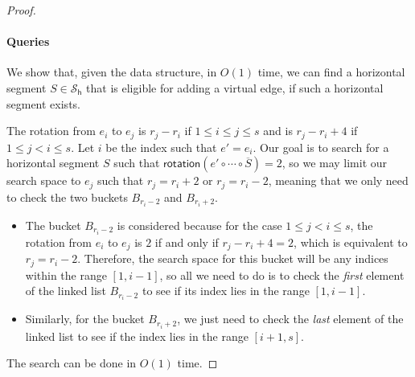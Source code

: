 \documentclass{article}\usepackage[a4paper,margin=20mm]{geometry}
\newcommand{\PH}{\mathcal{S}_\mathsf{h}}
\newcommand{\Nnorth}{\mathcal{N}_\mathsf{north}}
\newcommand{\rotation}{\mathsf{rotation}}
\begin{document}
\begin{proof}
\paragraph{Queries} We show that, given the data structure, in $O(1)$ time, we can find a horizontal segment $S \in \PH$ that is eligible for adding a virtual edge, if such a horizontal segment exists.

 The rotation  from $e_i$ to $e_j$ is $r_j - r_i$ if $1 \leq i \leq j \leq s$ and is $r_j - r_i +4$ if $1 \leq j < i \leq s$. Let $i$ be the index such that $e' = e_i$. Our goal is to search for a horizontal segment $S$ such that $\rotation(e' \circ \cdots \circ \overline{S}) = 2$, so we may limit our search space to $e_j$ such that 
 $r_j = r_i + 2$ or $r_j  = r_i -2$, meaning that we only need to check the two buckets $B_{r_i-2}$ and $B_{r_i+2}$.
 \begin{itemize}
     \item The bucket $B_{r_i-2}$ is considered because for the case $1 \leq j < i \leq s$, the rotation from $e_i$ to $e_j$ is $2$ if and only if $r_j - r_i +4 = 2$, which is equivalent to $r_j = r_i - 2$. Therefore, the search space for this bucket will be any indices within the range $[1,i-1]$, so all we need to do is to check the \emph{first} element of the linked list $B_{r_i-2}$ to see if its index lies in the range $[1,i-1]$.
     \item Similarly, for the bucket $B_{r_i+2}$, we just need to check the \emph{last} element of the linked list to see if the index lies in the range $[i+1, s]$.
 \end{itemize}
 The search can be done in $O(1)$ time.
 
 
 


\end{proof}
\end{document}
